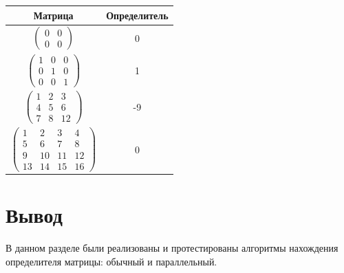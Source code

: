 \documentclass[12pt]{report}
\begin{document}
\begin{table}[H]
\begin{center}
            \begin{tabular}{|c|c|}
                \hline
                \rule[-1ex]{0pt}{2.5ex} Матрица & Определитель \\
                \hline
                \rule[-1ex]{0pt}{2.5ex} $\begin{pmatrix}
                                             0 & 0 \\
                                             0 & 0
                \end{pmatrix}$ & 0
                \\
                \hline
                \rule[-1ex]{0pt}{2.5ex} $\begin{pmatrix}
                                             1 & 0 & 0 \\
                                             0 & 1 & 0 \\
                                             0 & 0 & 1
                \end{pmatrix}$ & 1
                \\
                \hline
                \rule[-1ex]{0pt}{2.5ex}    $\begin{pmatrix}
                                                1 & 2 & 3  \\
                                                4 & 5 & 6  \\
                                                7 & 8 & 12
                \end{pmatrix}$ & -9
                \\
                \hline
                \rule[-1ex]{0pt}{2.5ex} $\begin{pmatrix}
                                             1  & 2  & 3  & 4  \\
                                             5  & 6  & 7  & 8  \\
                                             9  & 10 & 11 & 12 \\
                                             13 & 14 & 15 & 16
                \end{pmatrix}$ & 0
                \\
                \hline
            \end{tabular}
        \end{center}
    \end{table}


    \section{Вывод}
    В данном разделе были реализованы и протестированы алгоритмы нахождения определителя матрицы:
    обычный и параллельный.
    \newpage
\end{document}
